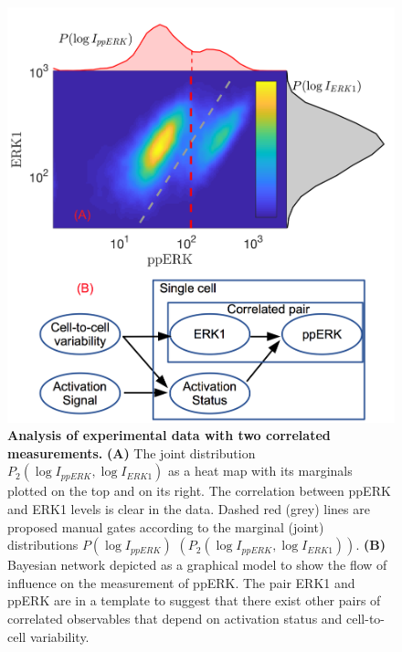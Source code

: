 \documentclass[11pt,a4paper,final]{article}
\begin{document}
\begin{figure}
    \centering
    \includegraphics[width=1\linewidth]{Fig4.png}
   \caption{\textbf{Analysis of experimental data with two correlated measurements.} \textbf{(A)} The joint distribution $P_2(\log I_{ppERK},\log I_{ERK1})$ as a heat map with its marginals plotted on the top and on its right. The correlation between ppERK and ERK1 levels is clear in the data. Dashed red (grey) lines are proposed manual gates according to the marginal (joint) distributions $P(\log I_{ppERK})$ $\left(P_2(\log I_{ppERK},\log I_{ERK1})\right)$. \textbf{(B)} Bayesian network depicted as a graphical model to show the flow of influence on the measurement of ppERK. The pair ERK1 and ppERK are in a template to suggest that there exist other pairs of correlated observables that depend on activation status and cell-to-cell variability.}
   \label{fig:ppERKvsERK1heatmap}
\end{figure}
\end{document}
